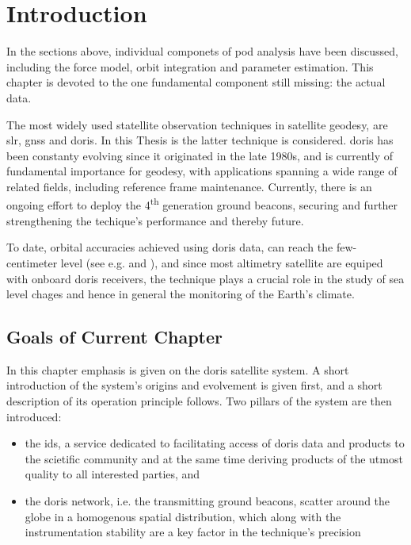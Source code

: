 \section{Introduction}\label{sec:doris-introduction}
In the sections above, individual componets of \gls{pod} analysis have been 
discussed, including the force model, orbit integration and parameter estimation. 
This chapter is devoted to the one fundamental component still missing: the actual data.

The most widely used statellite observation techniques in satellite geodesy, 
are \gls{slr}, \gls{gnss} and \gls{doris}. In this Thesis is the latter technique 
is considered. \gls{doris} has been constanty evolving since it originated in the 
late 1980s, and is currently of fundamental importance for geodesy, with applications 
spanning a wide range of related fields, including reference frame maintenance. 
Currently, there is an ongoing effort to deploy the 4\textsuperscript{th} generation 
ground beacons, securing and further strengthening the techique's performance and 
thereby future.

To date, orbital accuracies achieved using \gls{doris} data, can reach the few-centimeter 
level (see e.g. \cite{Rudenko2023} and \cite{Kong2017}), and since most altimetry satellite 
are equiped with onboard \gls{doris} receivers, the technique plays a crucial role in 
the study of sea level chages and hence in general the monitoring of the Earth's 
climate.

\subsection{Goals of Current Chapter}
In this chapter emphasis is given on the \gls{doris} satellite system. A short 
introduction of the system's origins and evolvement is given first, and a short 
description of its operation principle follows. Two pillars of the system are 
then introduced: 
\begin{itemize}
  \item the \gls{ids}, a service dedicated to facilitating access of \gls{doris} 
data and products to the scietific community and at the same time deriving products 
of the utmost quality to all interested parties, and 
  \item the \gls{doris} network, i.e. the transmitting ground beacons, scatter around the 
globe in a homogenous spatial distribution, which along with the instrumentation stability 
are a key factor in the technique's precision
\end{itemize}


